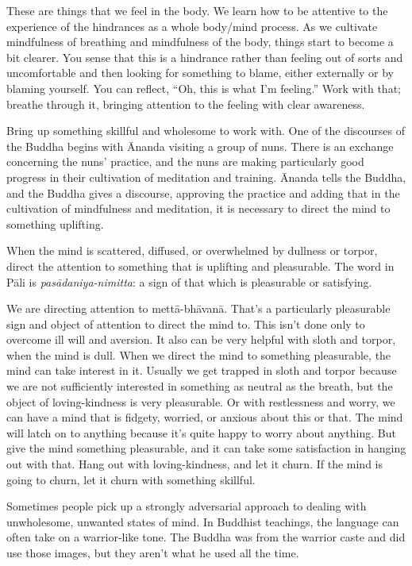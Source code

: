 These are things that we feel in the body. We learn how to be attentive
to the experience of the hindrances as a whole body/mind process. As we
cultivate mindfulness of breathing and mindfulness of the body, things
start to become a bit clearer. You sense that this is a hindrance rather
than feeling out of sorts and uncomfortable and then looking for
something to blame, either externally or by blaming yourself. You can
reflect, “Oh, this is what I’m feeling.” Work with that; breathe through
it, bringing attention to the feeling with clear awareness.

Bring up something skillful and wholesome to work with. One of the
discourses of the Buddha begins with Ānanda visiting a group of nuns.
There is an exchange concerning the nuns’ practice, and the nuns are
making particularly good progress in their cultivation of meditation and
training. Ānanda tells the Buddha, and the Buddha gives a discourse,
approving the practice and adding that in the cultivation of mindfulness
and meditation, it is necessary to direct the mind to something
uplifting.

When the mind is scattered, diffused, or overwhelmed by dullness or
torpor, direct the attention to something that is uplifting and
pleasurable. The word in Pāli is \emph{pasādaniya-nimitta}: a sign of
that which is pleasurable or satisfying.

We are directing attention to mettā-bhāvanā. That’s a particularly
pleasurable sign and object of attention to direct the mind to. This
isn’t done only to overcome ill will and aversion. It also can be very
helpful with sloth and torpor, when the mind is dull. When we direct the
mind to something pleasurable, the mind can take interest in it. Usually
we get trapped in sloth and torpor because we are not sufficiently
interested in something as neutral as the breath, but the object of
loving-kindness is very pleasurable. Or with restlessness and worry, we
can have a mind that is fidgety, worried, or anxious about this or that.
The mind will latch on to anything because it’s quite happy to worry
about anything. But give the mind something pleasurable, and it can take
some satisfaction in hanging out with that. Hang out with
loving-kindness, and let it churn. If the mind is going to churn, let it
churn with something skillful.

Sometimes people pick up a strongly adversarial approach to dealing with
unwholesome, unwanted states of mind. In Buddhist teachings, the
language can often take on a warrior-like tone. The Buddha was from the
warrior caste and did use those images, but they aren’t what he used all
the time.

